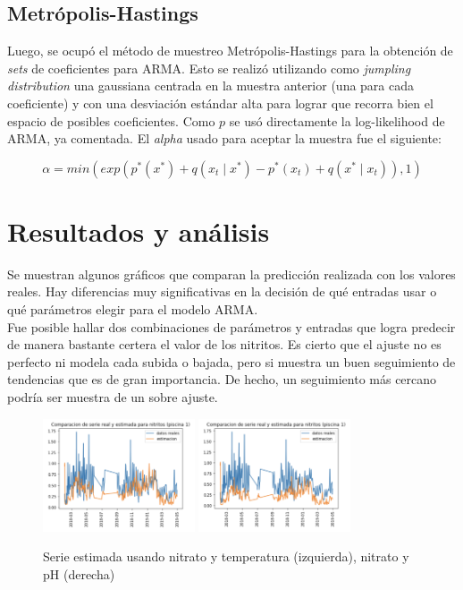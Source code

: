\documentclass[letterpaper, 12pt]{article}
\begin{document}
\subsection{Metrópolis-Hastings}

Luego, se ocupó el método de muestreo Metrópolis-Hastings para la obtención de \textit{sets} de coeficientes para ARMA. Esto se realizó utilizando como \textit{jumpling distribution} una gaussiana centrada en la muestra anterior (una para cada coeficiente) y con una desviación estándar alta para lograr que recorra bien el espacio de posibles coeficientes. Como $p$ se usó directamente la log-likelihood de ARMA, ya comentada. El \textit{alpha} usado para aceptar la muestra fue el siguiente:

\begin{equation*}
    \alpha = min(exp(p^*(x^*) + q(x_{t}\mid x^*) - p^*(x_{t}) + q(x^*\mid x_{t})), 1)
\end{equation*}


\section{Resultados y análisis}

Se muestran algunos gráficos que comparan la predicción realizada con los valores reales. Hay diferencias muy significativas en la decisión de qué entradas usar o qué parámetros elegir para el modelo ARMA.\\

Fue posible hallar dos combinaciones de parámetros y entradas que logra predecir de manera bastante certera el valor de los nitritos. Es cierto que el ajuste no es perfecto ni modela cada subida o bajada, pero si muestra un buen seguimiento de tendencias que es de gran importancia. De hecho, un seguimiento más cercano podría ser muestra de un sobre ajuste.

\begin{figure}[H]
  \centering
    \includegraphics[width=0.4\textwidth]{img/nitrato-temp.png}
    \includegraphics[width=0.4\textwidth]{img/nitrato-ph.png}
  \caption{Serie estimada usando nitrato y temperatura (izquierda), nitrato y pH (derecha)}
  \label{fig:results}
\end{figure}
\end{document}
